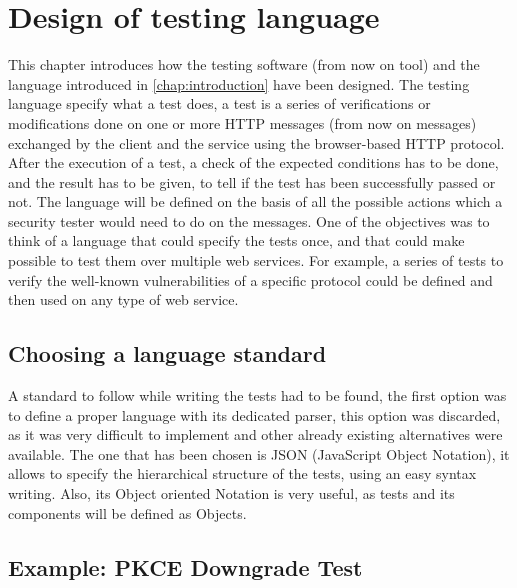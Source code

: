\chapter{Design of testing language}
\label{chap:Design}
This chapter introduces how the testing software (from now on tool) and the language introduced in \ref{chap:introduction} have been designed. The testing language specify what a test does, a test is a series of verifications or modifications done on one or more HTTP messages (from now on messages) exchanged by the client and the service using the browser-based HTTP protocol. After the execution of a test, a check of the expected conditions has to be done, and the result has to be given, to tell if the test has been successfully passed or not. The language will be defined on the basis of all the possible actions which a security tester would need to do on the messages. 
One of the objectives was to think of a language that could specify the tests once, and that could make possible to test them over multiple web services. For example, a series of tests to verify the well-known vulnerabilities of a specific protocol could be defined and then used on any type of web service.

\section{Choosing a language standard}
A standard to follow while writing the tests had to be found, the first option was to define a proper language with its dedicated parser, this option was discarded, as it was very difficult to implement and other already existing alternatives were available. The one that has been chosen is JSON (JavaScript Object Notation), it allows to specify the hierarchical structure of the tests, using an easy syntax writing. Also, its Object oriented Notation is very useful, as tests and its components will be defined as Objects.

\section{Example: PKCE Downgrade Test}
\label{sec:pkce_downgrade}

